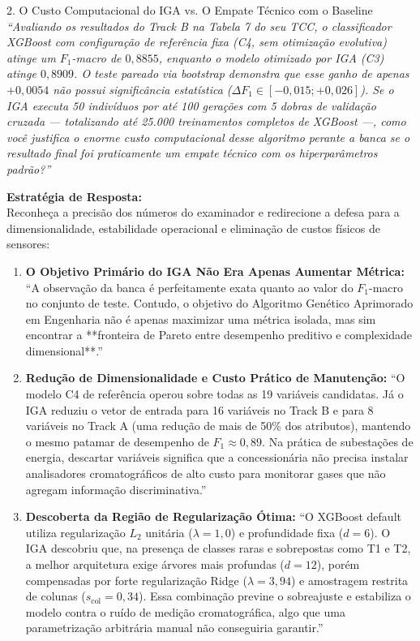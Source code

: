\documentclass[11pt,a4paper]{article}
\begin{document}
\begin{boardQuestion}{2. O Custo Computacional do IGA vs. O Empate Técnico com o Baseline}
\textit{“Avaliando os resultados do Track B na Tabela 7 do seu TCC, o classificador XGBoost com configuração de referência fixa (C4, sem otimização evolutiva) atinge um $F_1$-macro de $0{,}8855$, enquanto o modelo otimizado por IGA (C3) atinge $0{,}8909$. O teste pareado via bootstrap demonstra que esse ganho de apenas $+0{,}0054$ não possui significância estatística ($\Delta F_1 \in [-0{,}015; +0{,}026]$). Se o IGA executa 50 indivíduos por até 100 gerações com 5 dobras de validação cruzada — totalizando até 25.000 treinamentos completos de XGBoost —, como você justifica o enorme custo computacional desse algoritmo perante a banca se o resultado final foi praticamente um empate técnico com os hiperparâmetros padrão?”}
\end{boardQuestion}

\begin{boardAnswer}
\textbf{Estratégia de Resposta:}\\
Reconheça a precisão dos números do examinador e redirecione a defesa para a dimensionalidade, estabilidade operacional e eliminação de custos físicos de sensores:

\begin{enumerate}[leftmargin=0.8cm]
  \item \textbf{O Objetivo Primário do IGA Não Era Apenas Aumentar Métrica:} ``A observação da banca é perfeitamente exata quanto ao valor do $F_1$-macro no conjunto de teste. Contudo, o objetivo do Algoritmo Genético Aprimorado em Engenharia não é apenas maximizar uma métrica isolada, mas sim encontrar a **fronteira de Pareto entre desempenho preditivo e complexidade dimensional**.''
  \item \textbf{Redução de Dimensionalidade e Custo Prático de Manutenção:} ``O modelo C4 de referência operou sobre todas as 19 variáveis candidatas. Já o IGA reduziu o vetor de entrada para 16 variáveis no Track B e para 8 variáveis no Track A (uma redução de mais de 50\% dos atributos), mantendo o mesmo patamar de desempenho de $F_1 \approx 0{,}89$. Na prática de subestações de energia, descartar variáveis significa que a concessionária não precisa instalar analisadores cromatográficos de alto custo para monitorar gases que não agregam informação discriminativa.''
  \item \textbf{Descoberta da Região de Regularização Ótima:} ``O XGBoost default utiliza regularização $L_2$ unitária ($\lambda = 1{,}0$) e profundidade fixa ($d=6$). O IGA descobriu que, na presença de classes raras e sobrepostas como T1 e T2, a melhor arquitetura exige árvores mais profundas ($d=12$), porém compensadas por forte regularização Ridge ($\lambda = 3{,}94$) e amostragem restrita de colunas ($s_{\text{col}} = 0{,}34$). Essa combinação previne o sobreajuste e estabiliza o modelo contra o ruído de medição cromatográfica, algo que uma parametrização arbitrária manual não conseguiria garantir.''
\end{enumerate}
\end{boardAnswer}
\end{document}
